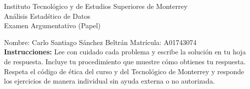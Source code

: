 \documentclass[10pt]{report}
\begin{document}
\newpage



\begin{center}
{\large Instituto Tecnol\'{o}gico y de Estudios Superiores de Monterrey \\
An\'alisis Estad\'stico de Datos } \\
Examen Argumentativo (Papel)
\end{center}

Nombre: \underline{\hspace*{.2in}}
Carlo Santiago S\'anchez Beltr\'an
\underline{\hspace*{.2in}} \quad Matr\'icula:\underline{\hspace*{.2in}}
A01743074
\underline{\hspace*{.2in}} \\

{\bf Instrucciones:} Lee con cuidado cada problema y escribe la soluci\'on
en tu hoja de respuesta. Incluye tu procedimiento que muestre c\'omo obtienes tu respuesta.  Respeta el c\'odigo de \'etica del curso y del Tecnol\'ogico de Monterrey y responde los ejercicios de manera individual sin ayuda externa o no autorizada.
\end{document}
